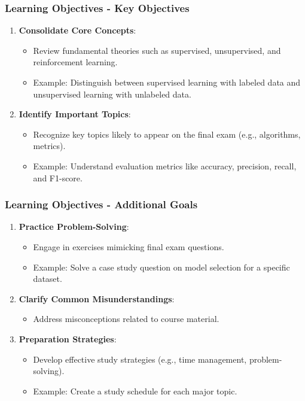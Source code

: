 \documentclass{beamer}
\begin{document}
\begin{frame}[fragile]
    \frametitle{Learning Objectives - Key Objectives}
    \begin{enumerate}
        \item \textbf{Consolidate Core Concepts}:
            \begin{itemize}
                \item Review fundamental theories such as supervised, unsupervised, and reinforcement learning.
                \item Example: Distinguish between supervised learning with labeled data and unsupervised learning with unlabeled data.
            \end{itemize}
        \item \textbf{Identify Important Topics}:
            \begin{itemize}
                \item Recognize key topics likely to appear on the final exam (e.g., algorithms, metrics).
                \item Example: Understand evaluation metrics like accuracy, precision, recall, and F1-score.
            \end{itemize}
    \end{enumerate}
\end{frame}

\begin{frame}[fragile]
    \frametitle{Learning Objectives - Additional Goals}
    \begin{enumerate}[resume]
        \item \textbf{Practice Problem-Solving}:
            \begin{itemize}
                \item Engage in exercises mimicking final exam questions.
                \item Example: Solve a case study question on model selection for a specific dataset.
            \end{itemize}
        \item \textbf{Clarify Common Misunderstandings}:
            \begin{itemize}
                \item Address misconceptions related to course material.
            \end{itemize}
        \item \textbf{Preparation Strategies}:
            \begin{itemize}
                \item Develop effective study strategies (e.g., time management, problem-solving).
                \item Example: Create a study schedule for each major topic.
            \end{itemize}
    \end{enumerate}
\end{frame}
\end{document}
